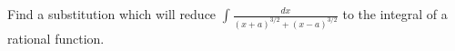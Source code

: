 Find a substitution which will reduce $\int \frac{dx}{(x + a)^{3/2} + (x - a)^{3/2}}$ to the
integral of a rational function. 
